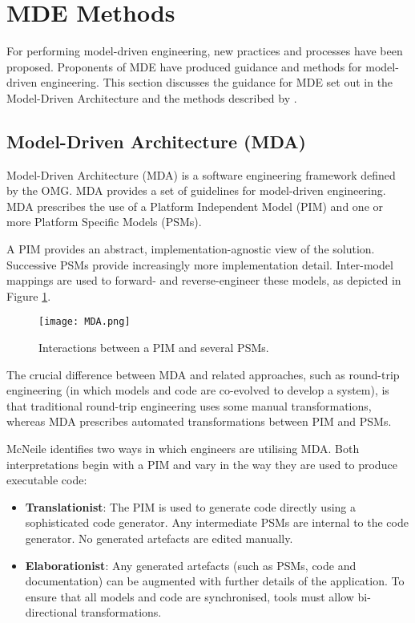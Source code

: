 
\section{MDE Methods}
\label{sec:mde_methods}
For performing model-driven engineering, new practices and processes have been proposed. Proponents of MDE have produced guidance and methods for model-driven engineering. This section discusses the guidance for MDE set out in the Model-Driven Architecture \cite{mda} and the methods described by \cite{stahl06mdsd,kelly08dsm,greenfield04software}. 

\subsection{Model-Driven Architecture (MDA)}
Model-Driven Architecture (MDA) is a software engineering framework defined by the OMG. MDA provides a set of guidelines for model-driven engineering. MDA prescribes the use of a Platform Independent Model (PIM) and one or more Platform Specific Models (PSMs).

A PIM provides an abstract, implementation-agnostic view of the solution. Successive PSMs provide increasingly more implementation detail. Inter-model mappings are used to forward- and reverse-engineer these models, as depicted in
Figure \ref{fig:mda}.

\begin{figure}[htbp]
  \begin{center}
    \leavevmode
    \texttt{[image: MDA.png]}
  \end{center}
  \caption{Interactions between a PIM and several PSMs.}
  \label{fig:mda}
\end{figure}

The crucial difference between MDA and related approaches, such as round-trip engineering (in which models and code are co-evolved to develop a system), is that traditional round-trip engineering uses some manual transformations, whereas MDA prescribes automated transformations between PIM and PSMs.

McNeile \cite{mcneile03mda} identifies two ways in which engineers are utilising MDA. Both interpretations begin with a PIM and vary in the way they are used to produce executable code:

\begin{itemize}
 \item \textbf{Translationist}: The PIM is used to generate code directly using a sophisticated code generator. Any intermediate PSMs are internal to the code generator. No generated artefacts are edited manually.
 \item \textbf{Elaborationist}: Any generated artefacts (such as PSMs, code and documentation) can be augmented with further details of the application. To ensure that all models and code are synchronised, tools must allow bi-directional transformations.
\end{itemize}

